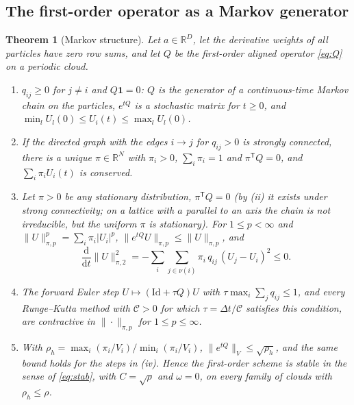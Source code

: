 \documentclass[11pt,a4paper]{article}
\theoremstyle{plain}
\newtheorem{theorem}{Theorem}[section]
\theoremstyle{definition}
\theoremstyle{remark}
\numberwithin{equation}{section}
\newcommand{\R}{\mathbb{R}}
\newcommand{\dd}{\mathrm{d}}
\newcommand{\nb}{\nu}
\newcommand{\Csp}{\mathcal{C}}
\begin{document}
\subsection{The first-order operator as a Markov generator}

\begin{theorem}[Markov structure]\label{thm:markov}
Let $a\in\R^D$, let the derivative weights of all particles have zero row sums, and let $Q$ be the first-order aligned operator \eqref{eq:Q} on a periodic cloud.
\begin{enumerate}[label=(\roman*)]
\item $q_{ij}\ge0$ for $j\ne i$ and $Q\mathbf 1=0$: $Q$ is the generator of a continuous-time Markov chain on the particles, $e^{tQ}$ is a stochastic matrix for $t\ge0$, and $\min_lU_l(0)\le U_i(t)\le\max_lU_l(0)$.
\item If the directed graph with the edges $i\to j$ for $q_{ij}>0$ is strongly connected, there is a unique $\pi\in\R^N$ with $\pi_i>0$, $\sum_i\pi_i=1$ and $\pi^{\mathsf T}Q=0$, and $\sum_i\pi_iU_i(t)$ is conserved.
\item Let $\pi>0$ be any stationary distribution, $\pi^{\mathsf T}Q=0$ (by (ii) it exists under strong connectivity; on a lattice with $a$ parallel to an axis the chain is not irreducible, but the uniform $\pi$ is stationary). For $1\le p<\infty$ and $\|U\|_{\pi,p}^p=\sum_i\pi_i|U_i|^p$, $\|e^{tQ}U\|_{\pi,p}\le\|U\|_{\pi,p}$, and
\begin{equation}\label{eq:energy}
\frac{\dd}{\dd t}\|U\|_{\pi,2}^2=-\sum_{i}\sum_{j\in\nb(i)}\pi_i\,q_{ij}\,(U_j-U_i)^2\le0 .
\end{equation}
\item The forward Euler step $U\mapsto(\mathrm{Id}+\tau Q)U$ with $\tau\max_i\sum_jq_{ij}\le1$, and every Runge--Kutta method with $\Csp>0$ for which $\tau=\Delta t/\Csp$ satisfies this condition, are contractive in $\|\cdot\|_{\pi,p}$ for $1\le p\le\infty$.
\item With $\rho_h=\max_i(\pi_i/V_i)/\min_i(\pi_i/V_i)$, $\|e^{tQ}\|_V\le\sqrt{\rho_h}$, and the same bound holds for the steps in (iv). Hence the first-order scheme is stable in the sense of \eqref{eq:stab}, with $C=\sqrt{\rho}$ and $\omega=0$, on every family of clouds with $\rho_h\le\rho$.
\end{enumerate}
\end{theorem}
\end{document}
